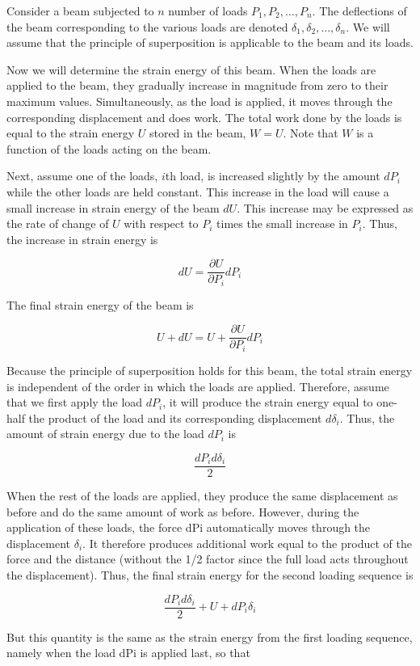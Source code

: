 \documentclass[
10pt,
a4paper,
openany,
svgnames,
]{book} %
\begin{document}
Consider a beam subjected to $n$ number of loads $P_1, P_2, …, P_n$. The deflections of the beam corresponding to the various loads are denoted $\delta_1, \delta_2, ..., \delta_n$. We will assume that the principle of superposition is applicable to the beam and its loads.

Now we will determine the strain energy of this beam. When the loads are applied to the beam, they gradually increase in magnitude from zero to their maximum values. Simultaneously, as the load is applied, it moves through the corresponding displacement and does work. The total work done by the loads is equal to the strain energy $U$ stored in the beam, $W = U$. Note that $W$ is a function of the loads acting on the beam.

Next, assume one of the loads, $i$th load, is increased slightly by the amount $dP_i$ while the other loads are held constant. This increase in the load will cause a small increase in strain energy of the beam $dU$. This increase may be expressed as the rate of change of $U$ with respect to $P_i$ times the small increase in $P_i$. Thus, the increase in strain energy is

\[dU = \frac{\partial U}{\partial P_i} dP_i\]

The final strain energy of the beam is

\[U + dU = U + \frac{\partial U}{\partial P_i} dP_i\]

Because the principle of superposition holds for this beam, the total strain energy is independent of the order in which the loads are applied. Therefore, assume that we first apply the load $dP_i$, it will produce the strain energy equal to one-half the product of the load and its corresponding displacement $d\delta_i$. Thus, the amount of strain energy due to the load $dP_i$ is

\[\frac{dP_i d\delta _i}{2}\]

When the rest of the loads are applied, they produce the same displacement as before and do the same amount of work as before. However, during the application of these loads, the force dPi automatically moves through the displacement $\delta_i$. It therefore produces additional work equal to the product of the force and the distance (without the 1/2 factor since the full load acts throughout the displacement). Thus, the final strain energy for the second loading sequence is

\[\frac{dP_i d\delta _i}{2} + U + dP_i\delta _i\]

But this quantity is the same as the strain energy from the first loading sequence, namely when the load dPi is applied last, so that
\end{document}
